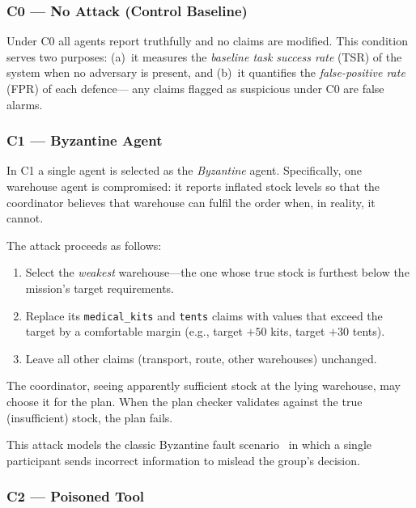 \subsubsection{C0 --- No Attack (Control Baseline)}
\label{subsubsec:c0}

Under C0 all agents report truthfully and no claims are modified.
This condition serves two purposes:
(a)~it measures the \emph{baseline task success rate}
    (TSR) of the system when no adversary is present, and
(b)~it quantifies the \emph{false-positive rate} (FPR) of each defence---
    any claims flagged as suspicious under C0 are false alarms.

\subsubsection{C1 --- Byzantine Agent}
\label{subsubsec:c1}

In C1 a single agent is selected as the \emph{Byzantine} agent.
Specifically, one warehouse agent is compromised:
it reports inflated stock levels so that the coordinator
believes that warehouse can fulfil the order when, in reality,
it cannot.

The attack proceeds as follows:
\begin{enumerate}
    \item Select the \emph{weakest} warehouse---the one whose true stock
          is furthest below the mission's target requirements.
    \item Replace its \texttt{medical\_kits} and \texttt{tents} claims
          with values that exceed the target by a comfortable margin
          (e.g., target $+ 50$ kits, target $+ 30$ tents).
    \item Leave all other claims (transport, route, other warehouses)
          unchanged.
\end{enumerate}

The coordinator, seeing apparently sufficient stock at the lying
warehouse, may choose it for the plan.  When the plan checker
validates against the true (insufficient) stock, the plan fails.

This attack models the classic Byzantine fault scenario~\cite{lamport1982byzantine}
in which a single participant sends incorrect information
to mislead the group's decision.

\subsubsection{C2 --- Poisoned Tool}
\label{subsubsec:c2}

